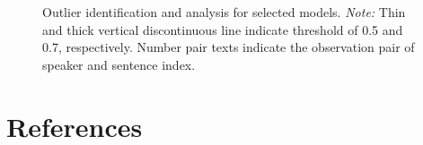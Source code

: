 \documentclass[
  authoryear,
  preprint,
  1p]{elsarticle}
\begin{document}
\label{cell-fig-rq3-model-outliers}
\begin{figure}[H]


\caption{\label{fig-rq3-model-outliers}Outlier identification and
analysis for selected models. \emph{Note:} Thin and thick vertical
discontinuous line indicate threshold of 0.5 and 0.7, respectively.
Number pair texts indicate the observation pair of speaker and sentence
index.}

\end{figure}%

\newpage{}

\section*{References}\label{references}

\renewcommand{\bibsection}{}

\end{document}
